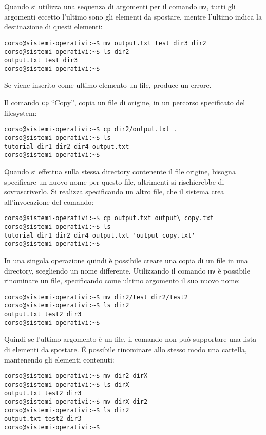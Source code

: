 \documentclass{article}
\numberwithin{equation}{subsection}
\begin{document}
Quando si utilizza una sequenza di argomenti per il comando \verb|mv|, tutti gli argomenti eccetto l'ultimo sono gli elementi da spostare, mentre l'ultimo indica la destinazione di questi elementi:
\begin{verbatim}
corso@sistemi-operativi:~$ mv output.txt test dir3 dir2
corso@sistemi-operativi:~$ ls dir2
output.txt test dir3
corso@sistemi-operativi:~$
\end{verbatim}
Se viene inserito come ultimo elemento un file, produce un errore. 

Il comando \verb|cp| ``Copy'', copia un file di origine, in un percorso specificato del filesystem:
\begin{verbatim}
corso@sistemi-operativi:~$ cp dir2/output.txt .
corso@sistemi-operativi:~$ ls
tutorial dir1 dir2 dir4 output.txt
corso@sistemi-operativi:~$
\end{verbatim} 

Quando si effettua sulla stessa directory contenente il file origine, bisogna specificare un nuovo nome per questo file, altrimenti si rischierebbe di sovrascriverlo. Si realizza specificando un altro file, 
che il sistema crea all'invocazione del comando:
\begin{verbatim}
corso@sistemi-operativi:~$ cp output.txt output\ copy.txt
corso@sistemi-operativi:~$ ls
tutorial dir1 dir2 dir4 output.txt 'output copy.txt'
corso@sistemi-operativi:~$
\end{verbatim}
In una singola operazione quindi è possibile creare una copia di un file in una directory, scegliendo un nome differente. Utilizzando il comando \verb|mv| è possibile rinominare un file, specificando come 
ultimo argomento il suo nuovo nome:
\begin{verbatim}
corso@sistemi-operativi:~$ mv dir2/test dir2/test2
corso@sistemi-operativi:~$ ls dir2
output.txt test2 dir3
corso@sistemi-operativi:~$
\end{verbatim} 
Quindi se l'ultimo argomento è un file, il comando non può supportare una lista di elementi da spostare. \'{E} possibile rinominare allo stesso modo una cartella, mantenendo gli elementi contenuti:
\begin{verbatim}
corso@sistemi-operativi:~$ mv dir2 dirX
corso@sistemi-operativi:~$ ls dirX
output.txt test2 dir3
corso@sistemi-operativi:~$ mv dirX dir2
corso@sistemi-operativi:~$ ls dir2
output.txt test2 dir3
corso@sistemi-operativi:~$
\end{verbatim}
\end{document}
